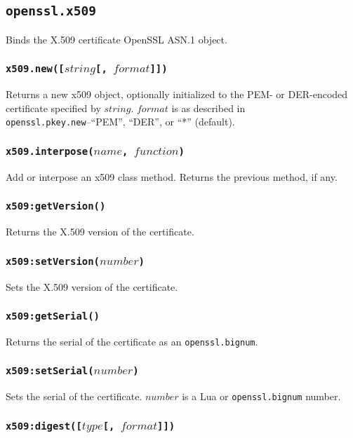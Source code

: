 \documentclass[11pt, oneside]{memoir}
\newcommand*{\fn}[1]{\texttt{#1}\xspace}
\newcommand*{\module}[1]{\texttt{#1}\xspace}
\newcounter{toccols}
\newenvironment{Module}[1]{
	\subsection{\texttt{#1}}
	\addtocontents{toc}{
		\protect\begin{multicols}{\value{toccols}}
	}
}{
	\addtocontents{toc}{\protect\end{multicols}}
}
\begin{document}
\begin{Module}{openssl.x509}

Binds the X.509 certificate OpenSSL ASN.1 object.

\subsubsection[\fn{x509.new}]{\fn{x509.new([$string$[, $format$]])}}

Returns a new x509 object, optionally initialized to the PEM- or DER-encoded certificate specified by $string$. $format$ is as described in \fn{openssl.pkey.new}--``PEM'', ``DER'', or ``*'' (default).

\subsubsection[\fn{x509.interpose}]{\fn{x509.interpose($name$, $function$)}}

Add or interpose an x509 class method. Returns the previous method, if any.

\subsubsection[\fn{x509:getVersion}]{\fn{x509:getVersion()}}

Returns the X.509 version of the certificate.

\subsubsection[\fn{x509:setVersion}]{\fn{x509:setVersion($number$)}}

Sets the X.509 version of the certificate.

\subsubsection[\fn{x509:getSerial}]{\fn{x509:getSerial()}}

Returns the serial of the certificate as an \module{openssl.bignum}.

\subsubsection[\fn{x509:setSerial}]{\fn{x509:setSerial($number$)}}

Sets the serial of the certificate. $number$ is a Lua or \module{openssl.bignum} number.

\subsubsection[\fn{x509:digest}]{\fn{x509:digest([$type$[, $format$]])}}


\end{Module}
\end{document}
